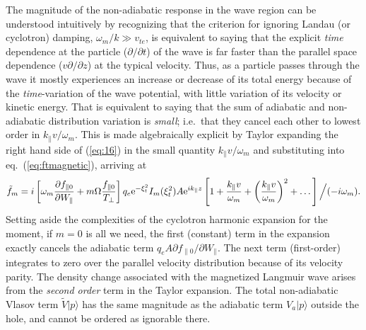 \documentclass[12pt]{article}
\def\ket#1{|#1\rangle}
\begin{document}
The magnitude of the non-adiabatic response in the wave region can be
understood intuitively by recognizing that the criterion for ignoring
Landau (or cyclotron) damping, $\omega_m/k\gg v_{te}$, is equivalent
to saying that the explicit \emph{time} dependence at the particle
($\partial/\partial t$) of the wave is far faster than the parallel
space dependence ($v\partial/\partial z$) at the typical
velocity. Thus, as a particle passes through the wave it mostly
experiences an increase or decrease of its total energy because of the
\emph{time}-variation of the wave potential, with little variation of
its velocity or kinetic energy. That is equivalent to saying that the
sum of adiabatic and non-adiabatic distribution variation is
\emph{small}; i.e.\ that they cancel each other to lowest order in
$k_\parallel v/\omega_m$. This is made algebraically explicit by
Taylor expanding the right hand side of (\ref{eq:16}) in the small
quantity $k_\parallel v/\omega_m$ and substituting into eq.\
(\ref{eq:ftmagnetic}), arriving at
\begin{equation}
  \label{eq:17}
  \tilde f_m = i\left[\omega_m
    {\partial f_{\parallel0}\over \partial W_\parallel}
    +m\Omega {f_{\parallel0}\over T_\perp}\right]
  q_e{\rm e}^{-\xi_t^2}I_m(\xi_t^2) A{\rm e}^{ik_\parallel z}
  \left[1+{k_\parallel v\over\omega_m}+
    \left({k_\parallel v\over\omega_m}\right)^2+\dots\right]
  \Big/(-i\omega_m).
\end{equation}
Setting aside the complexities of the cyclotron harmonic expansion for
the moment, if $m=0$ is all we need, the first (constant) term in the
expansion exactly cancels the adiabatic term
$q_eA{\partial f_{\parallel0}/\partial W_\parallel}$. The next term
(first-order) integrates to zero over the parallel velocity
distribution because of its velocity parity. The density change
associated with the magnetized Langmuir wave arises from the
\emph{second order} term in the Taylor expansion. The total
non-adiabatic Vlasov term $\tilde{V}\ket{p}$ has the same magnitude as
the adiabatic term $V_a\ket{p}$ outside the hole, and cannot be
ordered as ignorable there.
\end{document}
